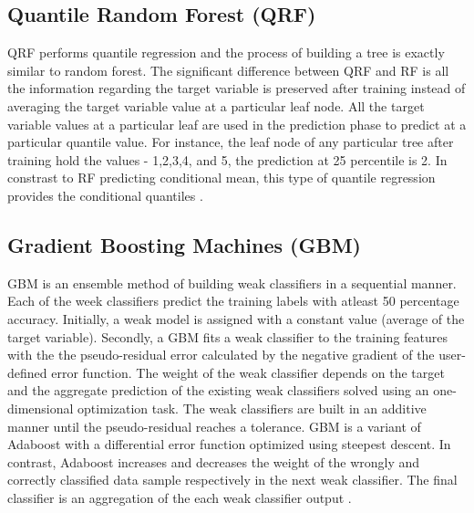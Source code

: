 \subsection{Quantile Random Forest (QRF)}

QRF performs quantile regression and the process of building a tree is exactly similar to random forest. The significant difference between QRF and RF is all the information regarding the target variable is preserved after training instead of averaging the target variable value at a particular leaf node. All the target variable values at a particular leaf are used in the prediction phase to predict at a particular quantile value. For instance, the leaf node of any particular tree after training hold the values - 1,2,3,4, and 5, the prediction at 25 percentile is 2. In constrast to RF predicting conditional mean, this type of quantile regression provides the conditional quantiles \cite{QRF} \cite{scikit-learn}.




\subsection{Gradient Boosting Machines (GBM)}

GBM is an ensemble method of building weak classifiers in a sequential manner. Each of the week classifiers predict the training labels with atleast 50 percentage accuracy. Initially, a weak model is assigned with a constant value (average of the target variable). Secondly, a GBM fits a weak classifier to the training features with the the pseudo-residual error calculated by the negative gradient of the user-defined error function. The weight of the weak classifier depends on the target and the aggregate prediction of the existing weak classifiers solved using an one-dimensional optimization task. The weak classifiers are built in an additive manner until the pseudo-residual reaches a tolerance. GBM is a variant of Adaboost with a differential error function optimized using steepest descent. In contrast, Adaboost increases and decreases the weight of the wrongly and correctly classified data sample respectively in the next weak classifier. The final classifier is an aggregation of the each weak classifier output \cite{GBM} \cite{Bishop_ML_book}.

